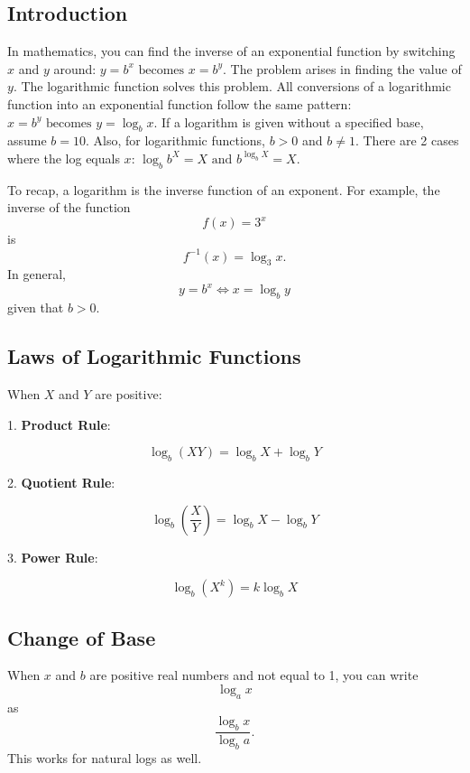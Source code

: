 \subsection{Introduction}
\label{sss:intr-8800}

In mathematics, you can find the inverse of an exponential function by switching $x$ and $y$ around: $y = b^x \text{ becomes } x = b^y$.  The problem arises in finding the value of $y$. The logarithmic function solves this problem. All conversions of a logarithmic function into an exponential function follow the same pattern:  $x = b^y \text{ becomes } y = \log_b x$.  If a logarithm is given without a specified base, assume $b = 10$. Also, for logarithmic functions, $b > 0$ and $b \neq 1$. There are 2 cases where the log equals $x$:  $\log_b b^X = X \text{ and } b^{\log_b X} = X$.

To recap, a logarithm is the inverse function of an exponent. For example, the inverse of
the function
\[
f(x) = 3^x
\]
is
\[
f^{-1}(x) = \log_3 x.
\]
In general,
\[
y = b^x \iff x = \log_b y
\]
given that $b > 0$.

\subsection{Laws of Logarithmic Functions}
\label{sss:laws-71be}

When $X$ and $Y$ are positive:

1. \textbf{Product Rule}:

   \[
\log_b (XY) = \log_b X + \log_b Y
\]

2. \textbf{Quotient Rule}:

   \[
\log_b \left(\frac{X}{Y}\right) = \log_b X - \log_b Y
\]

3. \textbf{Power Rule}:

   \[
\log_b (X^k) = k \log_b X
\]

\subsection{Change of Base}
\label{sss:chan-d752}

When $x$ and $b$ are positive real numbers and not equal to 1, you can write 
\[
\log_a x
\]
as
\[
\frac{\log_b x}{\log_b a}.
\]
This works for natural logs as well.

